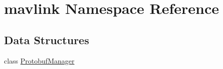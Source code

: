 \hypertarget{namespacemavlink}{\section{mavlink Namespace Reference}
\label{namespacemavlink}
}
\subsection*{Data Structures}
\begin{DoxyCompactItemize}
\item 
class \hyperlink{classmavlink_1_1_protobuf_manager}{Protobuf\-Manager}
\end{DoxyCompactItemize}
